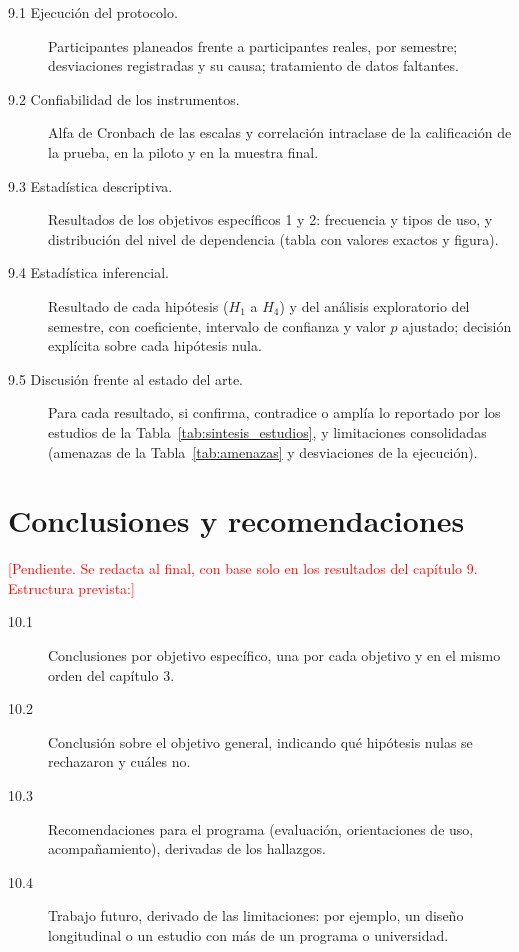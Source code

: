 \documentclass[12pt,letterpaper]{article}
\numberwithin{table}{section}
\numberwithin{figure}{section}
\newcommand{\pendiente}[1]{\textcolor{red}{[#1]}}
\begin{document}
\begin{description}
  \item[9.1 Ejecución del protocolo.] Participantes planeados frente a participantes reales, por semestre; desviaciones registradas y su causa; tratamiento de datos faltantes.
  \item[9.2 Confiabilidad de los instrumentos.] Alfa de Cronbach de las escalas y correlación intraclase de la calificación de la prueba, en la piloto y en la muestra final.
  \item[9.3 Estadística descriptiva.] Resultados de los objetivos específicos 1 y 2: frecuencia y tipos de uso, y distribución del nivel de dependencia (tabla con valores exactos y figura).
  \item[9.4 Estadística inferencial.] Resultado de cada hipótesis ($H_1$ a $H_4$) y del análisis exploratorio del semestre, con coeficiente, intervalo de confianza y valor $p$ ajustado; decisión explícita sobre cada hipótesis nula.
  \item[9.5 Discusión frente al estado del arte.] Para cada resultado, si confirma, contradice o amplía lo reportado por los estudios de la Tabla~\ref{tab:sintesis_estudios}, y limitaciones consolidadas (amenazas de la Tabla~\ref{tab:amenazas} y desviaciones de la ejecución).
\end{description}

\section{Conclusiones y recomendaciones}

\pendiente{Pendiente. Se redacta al final, con base solo en los resultados del capítulo 9. Estructura prevista:}

\begin{description}
  \item[10.1] Conclusiones por objetivo específico, una por cada objetivo y en el mismo orden del capítulo 3.
  \item[10.2] Conclusión sobre el objetivo general, indicando qué hipótesis nulas se rechazaron y cuáles no.
  \item[10.3] Recomendaciones para el programa (evaluación, orientaciones de uso, acompañamiento), derivadas de los hallazgos.
  \item[10.4] Trabajo futuro, derivado de las limitaciones: por ejemplo, un diseño longitudinal o un estudio con más de un programa o universidad.
\end{description}
\end{document}
